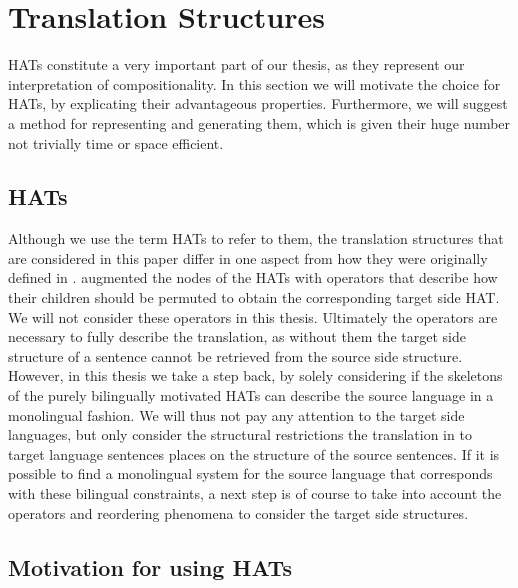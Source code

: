 \documentclass[hidelinks]{report}
\begin{document}
\section{Translation Structures}
\label{sec:comp_structures2}

HATs constitute a very important part of our thesis, as they represent our interpretation of compositionality. In this section we will motivate the choice for HATs, by explicating their advantageous properties. Furthermore, we will suggest a method for representing and generating them, which is given their huge number not trivially time or space efficient.

\subsection{HATs}

Although we use the term HATs to refer to them, the translation structures that are considered in this paper differ in one aspect from how they were originally defined in \citep{simaan2013hats}. \citeauthor{simaan2013hats} augmented the nodes of the HATs with operators that describe how their children should be permuted to obtain the corresponding target side HAT. We will not consider these operators in this thesis. Ultimately the operators are necessary to fully describe the translation, as without them the target side structure of a sentence cannot be retrieved from the source side structure. However, in this thesis we take a step back, by solely considering if the skeletons of the purely bilingually motivated HATs can describe the source language in a monolingual fashion. We will thus not pay any attention to the target side languages, but only consider the structural restrictions the translation in to target language sentences places on the structure of the source sentences. If it is possible to find a monolingual system for the source language that corresponds with these bilingual constraints, a next step is of course to take into account the operators and reordering phenomena to consider the target side structures.

\subsection{Motivation for using HATs}
\end{document}
